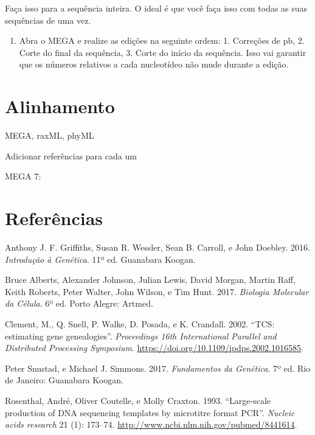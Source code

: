 \documentclass[
  letterpaper,
  DIV=11,
  numbers=noendperiod]{scrreprt}
\providecommand{\tightlist}{%
  \setlength{\itemsep}{0pt}\setlength{\parskip}{0pt}}\usepackage{longtable,booktabs,array}
\newlength{\cslhangindent}
\newlength{\cslentryspacingunit} %
\newenvironment{CSLReferences}[2] %
 {%
  \setlength{\parindent}{0pt}
  \ifodd #1
  \let\oldpar\par
  \def\par{\hangindent=\cslhangindent\oldpar}
  \fi
  \setlength{\parskip}{#2\cslentryspacingunit}
 }%
 {}
\begin{document}
Faça isso para a sequência inteira. O ideal é que você faça isso com
todas as suas sequências de uma vez.

\begin{enumerate}
\def\labelenumi{\arabic{enumi}.}
\setcounter{enumi}{1}
\tightlist
\item
  Abra o MEGA e realize as edições na seguinte ordem: 1. Correções de
  pb, 2. Corte do final da sequência, 3. Corte do início da sequência.
  Isso vai garantir que os números relativos a cada nucleotídeo não mude
  durante a edição.
\end{enumerate}

\hypertarget{alinhamento}{%
\chapter{Alinhamento}\label{alinhamento}}

MEGA, raxML, phyML

Adicionar referências para cada um

MEGA 7:


\hypertarget{referuxeancias}{%
\chapter*{Referências}\label{referuxeancias}}


\hypertarget{refs}{}
\begin{CSLReferences}{1}{0}
\leavevmode{}%
Anthony J. F. Griffiths, Susan R. Wessler, Sean B. Carroll, e John
Doebley. 2016. \emph{Introdução à Genética}. 11º ed. Guanabara Koogan.

\leavevmode{}%
Bruce Alberts, Alexander Johnson, Julian Lewis, David Morgan, Martin
Raff, Keith Roberts, Peter Walter, John Wilson, e Tim Hunt. 2017.
\emph{Biologia Molecular da Célula}. 6º ed. Porto Alegre: Artmed.

\leavevmode{}%
Clement, M., Q. Snell, P. Walke, D. Posada, e K. Crandall. 2002. {``TCS:
estimating gene genealogies''}. \emph{Proceedings 16th International
Parallel and Distributed Processing Symposium}.
\url{https://doi.org/10.1109/ipdps.2002.1016585}.

\leavevmode{}%
Peter Snustad, e Michael J. Simmons. 2017. \emph{Fundamentos da
Genética}. 7º ed. Rio de Janeiro: Guanabara Koogan.

\leavevmode{}%
Rosenthal, André, Oliver Coutelle, e Molly Craxton. 1993. {``Large-scale
production of DNA sequencing templates by microtitre format PCR''}.
\emph{Nucleic acids research} 21 (1): 173--74.
\url{http://www.ncbi.nlm.nih.gov/pubmed/8441614}.

\end{CSLReferences}
\end{document}

